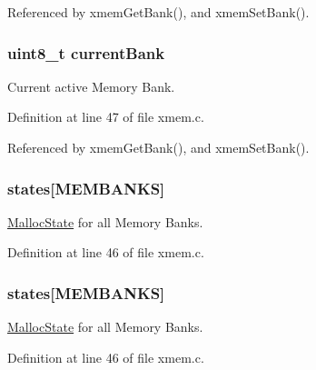 Referenced by xmem\-Get\-Bank(), and xmem\-Set\-Bank().

\hypertarget{group__xmem_ga4a1acf2db179d35f089bd00881d1c2eb}{
\subsubsection[{current\-Bank}]{\setlength{\rightskip}{0pt plus 5cm}uint8\-\_\-t current\-Bank}}\label{group__xmem_ga4a1acf2db179d35f089bd00881d1c2eb}


Current active Memory Bank. 



Definition at line 47 of file xmem.\-c.



Referenced by xmem\-Get\-Bank(), and xmem\-Set\-Bank().

\hypertarget{group__xmem_gabe6eb8575dfb63d41e3ca7fe774d1b27}{
\subsubsection[{states}]{ states\mbox{[}{\bf M\-E\-M\-B\-A\-N\-K\-S}\mbox{]}}}\label{group__xmem_gabe6eb8575dfb63d41e3ca7fe774d1b27}


\hyperlink{struct_malloc_state}{Malloc\-State} for all Memory Banks. 



Definition at line 46 of file xmem.\-c.

\hypertarget{group__xmem_gabe6eb8575dfb63d41e3ca7fe774d1b27}{
\subsubsection[{states}]{ states\mbox{[}{\bf M\-E\-M\-B\-A\-N\-K\-S}\mbox{]}}}\label{group__xmem_gabe6eb8575dfb63d41e3ca7fe774d1b27}


\hyperlink{struct_malloc_state}{Malloc\-State} for all Memory Banks. 



Definition at line 46 of file xmem.\-c.

